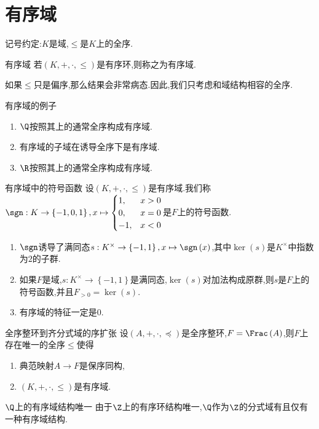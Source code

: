 \section{有序域}

记号约定:$K$是域,$\leq$是$K$上的全序.

\begin{definition}{有序域}{}
	若$\left(K,+,\cdot,\leq\right)$是有序环,则称之为有序域.
\end{definition}

\begin{remark}{}{}
	如果$\leq$只是偏序,那么结果会非常病态.因此,我们只考虑和域结构相容的全序.
\end{remark}

\begin{example}{有序域的例子}{}
	\begin{enumerate}
		\item $\Q$按照其上的通常全序构成有序域.
		\item 有序域的子域在诱导全序下是有序域.
		\item  $\R$按照其上的通常全序构成有序域.
	\end{enumerate}
\end{example}

\begin{definition}{有序域中的符号函数}{}
	设$\left(K,+,\cdot,\leq\right)$是有序域.我们称$\sgn:K\to\left\{-1,0,1\right\},x\mapsto
	\begin{cases}
		1,&x>0\\
		0,&x=0\\
		-1,&x<0
	\end{cases}$是$F$上的符号函数.
\end{definition}

\begin{remark}{}{}
	\begin{enumerate}
		\item $\sgn$诱导了满同态$s:K^{\times}\to\left\{-1,1\right\},x\mapsto\sgn\left(x\right)$,其中$\ker\left(s\right)$是$K^{\times}$中指数为$2$的子群.
		\item 如果$F$是域,$s:K^{\times}\to\left\{-1,1\right\}$是满同态,$\ker\left(s\right)$对加法构成原群,则$s$是$F$上的符号函数,并且$F_{>0}=\ker\left(s\right)$.
		\item 有序域的特征一定是$0$.
	\end{enumerate}
\end{remark}

\begin{proposition}{全序整环到齐分式域的序扩张}{}
	设$\left(A,+,\cdot,\preccurlyeq\right)$是全序整环,$F=\Frac\left(A\right)$,则$F$上存在唯一的全序$\leqslant$使得
	\begin{enumerate}
		\item 典范映射$A\to F$是保序同构,
		\item $\left(K,+,\cdot,\leqslant\right)$是有序域.
	\end{enumerate}
\end{proposition}

\begin{example}{$\Q$上的有序域结构唯一}{}
	由于$\Z$上的有序环结构唯一,$\Q$作为$\Z$的分式域有且仅有一种有序域结构.
\end{example}


